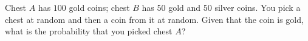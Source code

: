 Chest $A$ has $100$ gold coins; chest $B$ has $50$ gold and $50$ silver coins. You pick a chest at random and then a coin from it at random. Given that the coin is gold, what is the probability that you picked chest $A$?
